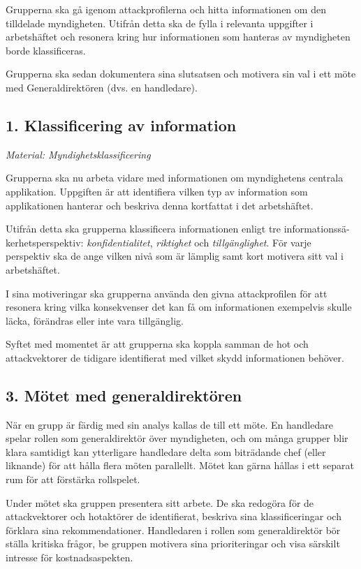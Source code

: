\documentclass{article}
\begin{document}
Grupperna ska gå igenom attackprofilerna och hitta informationen om den tilldelade myndigheten. Utifrån detta ska de fylla i relevanta uppgifter i arbetshäftet och resonera kring hur informationen som hanteras av myndigheten borde klassificeras.

Grupperna ska sedan dokumentera sina slutsatsen och motivera sin val i ett möte med Generaldirektören (dvs. en handledare).

\subsection{1. Klassificering av information}

\textit{Material: Myndighetsklassificering}

Grupperna ska nu arbeta vidare med informationen om myndighetens centrala applikation. Uppgiften är att identifiera vilken typ av information som applikationen hanterar och beskriva denna kortfattat i det arbetshäftet.

Utifrån detta ska grupperna klassificera informationen enligt tre informationssä-kerhetsperspektiv: \textit{konfidentialitet}, \textit{riktighet} och \textit{tillgänglighet}. För varje perspektiv ska de ange vilken nivå som är lämplig samt kort motivera sitt val i arbetshäftet.

I sina motiveringar ska grupperna använda den givna attackprofilen för att resonera kring vilka konsekvenser det kan få om informationen exempelvis skulle läcka, förändras eller inte vara tillgänglig.

Syftet med momentet är att grupperna ska koppla samman de hot och attackvektorer de tidigare identifierat med vilket skydd informationen behöver.

\subsection{3. Mötet med generaldirektören}

När en grupp är färdig med sin analys kallas de till ett möte. En handledare spelar rollen som generaldirektör över myndigheten, och om många grupper blir klara samtidigt kan ytterligare handledare delta som biträdande chef (eller liknande) för att hålla flera möten parallellt. Mötet kan gärna hållas i ett separat rum för att förstärka rollspelet.

Under mötet ska gruppen presentera sitt arbete. De ska redogöra för de attackvektorer och hotaktörer de identifierat, beskriva sina klassificeringar och förklara sina rekommendationer. Handledaren i rollen som generaldirektör bör ställa kritiska frågor, be gruppen motivera sina prioriteringar och visa särskilt intresse för kostnadsaspekten.
\end{document}
